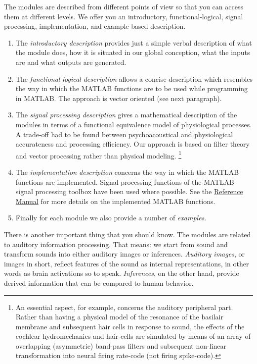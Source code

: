 The modules are described from different points of view so that
you can access them at different levels. We offer you an
introductory, functional-logical, signal processing,
implementation, and example-based description.
\begin{enumerate}
\item
    The \emph{introductory description} provides just a simple verbal
    description of what the module does, how it is situated in our
    global conception, what the inputs are and what outputs are generated.
\item
    The \emph{functional-logical description}
    allows a concise description which resembles the way in
    which the MATLAB functions are to be used while programming in MATLAB.
    The approach is vector oriented (see next paragraph).
\item
    The \emph{signal processing description} gives a mathematical
    description of the modules in terms of a functional
    equivalence model of physiological processes. A trade-off had
    to be found between psychoacoustical and physiological
    accurateness and processing efficiency. Our approach is based
    on filter theory and vector processing rather than physical
    modeling.
    \footnote{An essential aspect, for example, concerns the
    auditory peripheral part. Rather than having a physical model
    of the resonance of the basilair membrane and subsequent hair
    cells in response to sound, the effects of the cochlear
    hydromechanics and hair cells are simulated by means of an
    array of overlapping (asymmetric) band-pass filters and
    subsequent non-linear transformation into neural firing
    rate-code (not firing spike-code).}
\item
    The \emph{implementation description} concerns the way in
    which the MATLAB functions are implemented.
    Signal processing functions of the MATLAB signal processing toolbox have
    been used where possible.
    See the \hyperlink{Part:ReferenceManual}{Reference Manual}
    for more details on the implemented MATLAB functions.
\item
    Finally for each module we also provide a number of
    \emph{examples}.
\end{enumerate}

There is another important thing that you should know. The modules
are related to auditory information processing. That means: we
start from sound and transform sounds into either auditory images
or inferences. \emph{Auditory images}, or images in short, reflect
features of the sound as internal representations, in other words
as brain activations so to speak. \emph{Inferences}, on the other
hand, provide derived information that can be compared to human
behavior.

